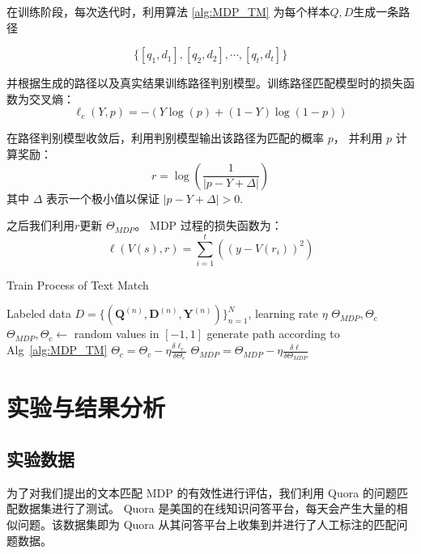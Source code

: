 在训练阶段，每次迭代时，利用算法 \ref{alg:MDP_TM} 为每个样本$Q, D$生成一条路径

$$\{[q_1, d_1], [q_2, d_2], \cdots, [q_t, d_t]\}$$

并根据生成的路径以及真实结果训练路径判别模型。训练路径匹配模型时的损失函数为交叉熵：
\begin{equation}
\label{eq:classify_model}
\ell_c(Y, p) = -(Y\log(p) + (1-Y)\log(1-p))
\end{equation}

在路径判别模型收敛后，利用判别模型输出该路径为匹配的概率 $p$， 并利用 $p$ 计算奖励：
$$
r = \log(\frac{1}{|p-Y+\Delta|})
$$
其中 $\Delta$ 表示一个极小值以保证 $|p-Y+\Delta| > 0$.

之后我们利用$r$更新 $\Theta_{MDP}$。 MDP 过程的损失函数为：
\begin{equation}
\label{eq:MDP_model}
\ell(V(s), r) = \sum_{i=1}^t\left((y - V(r_i))^2\right)
\end{equation}

\begin{algorithm}[!htbp]
    \small
    \caption{Train Process of Text Match}\label{alg:TM_train}
    \renewcommand{\algorithmicrequire}{\textbf{Input:}}
    \renewcommand{\algorithmicensure}{\textbf{Output:}}
    \begin{algorithmic}
        \Require Labeled data $D=\{ (\mathbf{Q}^{(n)}, \mathbf{D}^{(n)}, \mathbf{Y}^{(n)})\}_{n=1}^N$, learning rate $\eta$
        \Ensure $\Theta_{MDP}, \Theta_{c}$
        \State {} $\Theta_{MDP}, \Theta_{c} \leftarrow$ random values in $[-1, 1]$
          \State generate path according to Alg~\ref{alg:MDP_TM}
            \State $\Theta_{c} = \Theta_{c} - \eta \frac{\delta \ell_c}{\delta \Theta_{c}}$ 
          \EndWhile
          \State $\Theta_{MDP} = \Theta_{MDP} - \eta \frac{\delta \ell}{\delta \Theta_{MDP}}$ 
        \EndWhile
    \end{algorithmic}
\end{algorithm}

\section{实验与结果分析}
\subsection{实验数据}
为了对我们提出的文本匹配 MDP 的有效性进行评估，我们利用 Quora 的问题匹配数据集进行了测试。 Quora 是美国的在线知识问答平台，每天会产生大量的相似问题。该数据集即为 Quora 从其问答平台上收集到并进行了人工标注的匹配问题数据。

